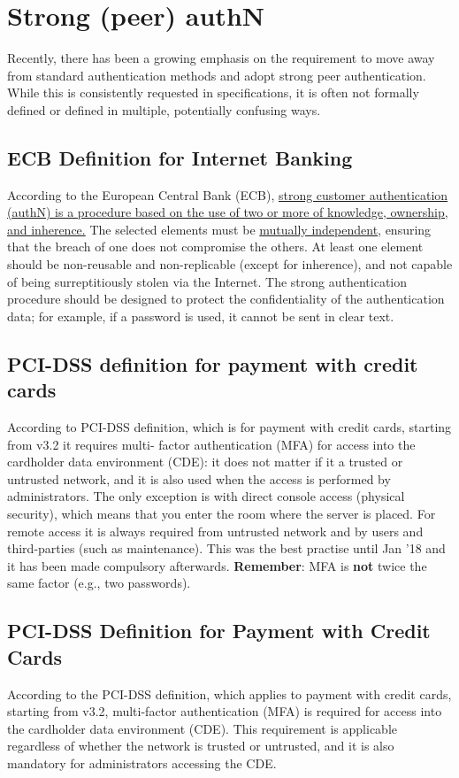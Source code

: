 \section{Strong (peer) authN}
Recently, there has been a growing emphasis on the requirement to move away from standard authentication methods and adopt strong peer authentication. While this is consistently requested in specifications, it is often not formally defined or defined in multiple, potentially confusing ways.



\subsection{ECB Definition for Internet Banking}
According to the European Central Bank (ECB), \ul{strong customer authentication (authN) is a procedure based on the use of two or more of knowledge, ownership, and inherence.} The selected elements must be \ul{mutually independent}, ensuring that the breach of one does not compromise the others. At least one element should be non-reusable and non-replicable (except for inherence), and not capable of being surreptitiously stolen via the Internet. The strong authentication procedure should be designed to protect the confidentiality of the authentication data; for example, if a password is used, it cannot be sent in clear text.



\subsection{PCI-DSS definition for payment with credit cards}
According to PCI-DSS definition, which is for payment with credit cards, starting from v3.2 it requires multi-
factor authentication (MFA) for access into the cardholder data environment (CDE): it does not matter if it
a trusted or untrusted network, and it is also used when the access is performed by administrators. The only
exception is with direct console access (physical security), which means that you enter the room where the server is placed. For remote access it is always required from untrusted network and by users and third-parties (such as maintenance).
This was the best practise until Jan '18 and it has been made compulsory afterwards.
\textbf{Remember}: MFA is \textbf{not} twice the same factor (e.g., two passwords).


\subsection{PCI-DSS Definition for Payment with Credit Cards}
According to the PCI-DSS definition, which applies to payment with credit cards, starting from v3.2, multi-factor authentication (MFA) is required for access into the cardholder data environment (CDE). This requirement is applicable regardless of whether the network is trusted or untrusted, and it is also mandatory for administrators accessing the CDE.

